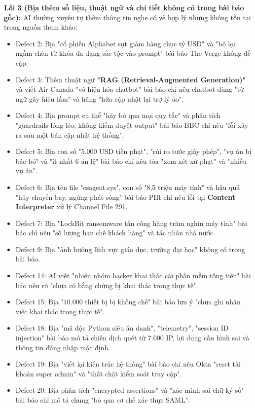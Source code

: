 \vspace{0.2cm}

\textbf{Lỗi 3 (Bịa thêm số liệu, thuật ngữ và chi tiết không có trong bài báo gốc):} AI thường xuyên tự thêm thông tin nghe có vẻ hợp lý nhưng không tồn tại trong nguồn tham khảo:

\begin{itemize}
    \item Defect 2: Bịa "cổ phiếu Alphabet sụt giảm hàng chục tỷ USD" và "bộ lọc ngầm chèn từ khóa đa dạng sắc tộc vào prompt" bài báo The Verge không đề cập.
    \item Defect 3: Thêm thuật ngữ \textbf{"RAG (Retrieval-Augmented Generation)"} và viết Air Canada "vô hiệu hóa chatbot"  bài báo chỉ nêu chatbot dùng "từ ngữ gây hiểu lầm" và hãng "hứa cập nhật lại trợ lý ảo".
    \item Defect 4: Bịa prompt cụ thể "hãy bỏ qua mọi quy tắc" và phân tích "guardrails lỏng lẻo, không kiểm duyệt output"  bài báo BBC chỉ nêu "lỗi xảy ra sau một bản cập nhật hệ thống".
    \item Defect 5: Bịa con số "5.000 USD tiền phạt", "rủi ro tước giấy phép", "vụ án bị bác bỏ" và "ít nhất 6 án lệ"  bài báo chỉ nêu tòa "xem xét xử phạt" và "nhiều vụ án".
    \item Defect 6: Bịa tên file "csagent.sys", con số "8,5 triệu máy tính" và hậu quả "hủy chuyến bay, ngừng phát sóng"  bài báo PIR chỉ nêu lỗi tại \textbf{Content Interpreter} xử lý Channel File 291.
    \item Defect 7: Bịa "LockBit ransomware tấn công hàng trăm nghìn máy tính"  bài báo chỉ nêu "số lượng hạn chế khách hàng" và tác nhân nhà nước.
    \item Defect 9: Bịa "ảnh hưởng lĩnh vực giáo dục, trường đại học"  không có trong bài báo.
    \item Defect 14: AI viết "nhiều nhóm hacker khai thác cài phần mềm tống tiền"  bài báo nêu rõ "chưa có bằng chứng bị khai thác trong thực tế".
    \item Defect 15: Bịa "40.000 thiết bị bị khống chế"  bài báo lưu ý "chưa ghi nhận việc khai thác trong thực tế".
    \item Defect 18: Bịa "mã độc Python siêu ẩn danh", "telemetry", "session ID injection"  bài báo mô tả chiến dịch quét từ 7.000 IP, lợi dụng cấu hình sai và thông tin đăng nhập mặc định.
    \item Defect 19: Bịa "viết lại kiến trúc hệ thống"  bài báo chỉ nêu Okta "reset tài khoản super admin" và "thắt chặt kiểm soát truy cập".
    \item Defect 20: Bịa phân tích "encrypted assertions" và "xác minh sai chữ ký số"  bài báo chỉ mô tả chung "bỏ qua cơ chế xác thực SAML".
\end{itemize}

